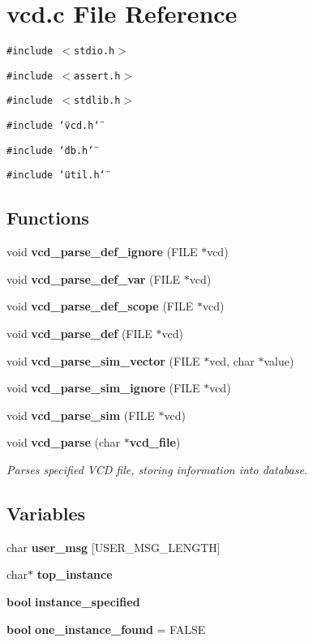\section{vcd.c File Reference}
\label{vcd_8c}
{\tt \#include $<$stdio.h$>$}\par
{\tt \#include $<$assert.h$>$}\par
{\tt \#include $<$stdlib.h$>$}\par
{\tt \#include \char`\"{}vcd.h\char`\"{}}\par
{\tt \#include \char`\"{}db.h\char`\"{}}\par
{\tt \#include \char`\"{}util.h\char`\"{}}\par
\subsection*{Functions}
\begin{CompactItemize}
\item 
void {\bf vcd\_\-parse\_\-def\_\-ignore} (FILE $\ast$vcd)
\item 
void {\bf vcd\_\-parse\_\-def\_\-var} (FILE $\ast$vcd)
\item 
void {\bf vcd\_\-parse\_\-def\_\-scope} (FILE $\ast$vcd)
\item 
void {\bf vcd\_\-parse\_\-def} (FILE $\ast$vcd)
\item 
void {\bf vcd\_\-parse\_\-sim\_\-vector} (FILE $\ast$vcd, char $\ast$value)
\item 
void {\bf vcd\_\-parse\_\-sim\_\-ignore} (FILE $\ast$vcd)
\item 
void {\bf vcd\_\-parse\_\-sim} (FILE $\ast$vcd)
\item 
void {\bf vcd\_\-parse} (char $\ast${\bf vcd\_\-file})
\begin{CompactList}\small\item\em Parses specified VCD file, storing information into database.\item\end{CompactList}\end{CompactItemize}
\subsection*{Variables}
\begin{CompactItemize}
\item 
char {\bf user\_\-msg} [USER\_\-MSG\_\-LENGTH]
\item 
char$\ast$ {\bf top\_\-instance}
\item 
{\bf bool} {\bf instance\_\-specified}
\item 
{\bf bool} {\bf one\_\-instance\_\-found} = FALSE
\end{CompactItemize}


